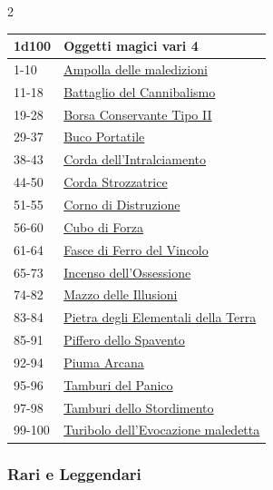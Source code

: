 \begin{multicols}{2}
{{\small\begin{tabularx}{\linewidth}{ll}
		\toprule
\rowcolor{gray!20}\textbf{1d100} & \textbf{Oggetti magici vari 4}\\
\toprule
1-10 & \hyperlink{Ampolla delle maledizioni}{Ampolla delle maledizioni}\\
\rowcolor{gray!20}11-18 & \hyperlink{Battaglio del Cannibalismo}{Battaglio del Cannibalismo}\\
19-28 & \hyperlink{Borsa Conservante Tipo II}{Borsa Conservante Tipo II}\\
\rowcolor{gray!20}29-37 & \hyperlink{Buco Portatile}{Buco Portatile}\\
38-43 & \hyperlink{Corda dell'Intralciamento}{Corda dell'Intralciamento}\\
\rowcolor{gray!20}44-50 & \hyperlink{Corda Strozzatrice}{Corda Strozzatrice}\\
51-55 & \hyperlink{Corno di Distruzione}{Corno di Distruzione}\\
\rowcolor{gray!20}56-60 & \hyperlink{Cubo di Forza}{Cubo di Forza}\\
61-64 & \hyperlink{Fasce di Ferro del Vincolo}{Fasce di Ferro del Vincolo}\\
\rowcolor{gray!20}65-73 & \hyperlink{Incenso dell'Ossessione}{Incenso dell'Ossessione}\\
74-82 & \hyperlink{Mazzo delle Illusioni}{Mazzo delle Illusioni}\\
\rowcolor{gray!20}83-84 & \hyperlink{Pietra degli Elementali della Terra}{Pietra degli Elementali della Terra}\\
85-91 & \hyperlink{Piffero dello Spavento}{Piffero dello Spavento}\\
\rowcolor{gray!20}92-94 & \hyperlink{Piuma Arcana}{Piuma Arcana}\\
95-96 & \hyperlink{Tamburi del Panico}{Tamburi del Panico}\\
\rowcolor{gray!20}97-98 & \hyperlink{Tamburi dello Stordimento}{Tamburi dello Stordimento}\\
99-100 & \hyperlink{Turibolo dell'Evocazione maledetta}{Turibolo dell'Evocazione maledetta}
\end{tabularx}}


\subsubsection{Rari e Leggendari}\hypertarget{Rari e Leggendari}{}

}
\end{multicols}
